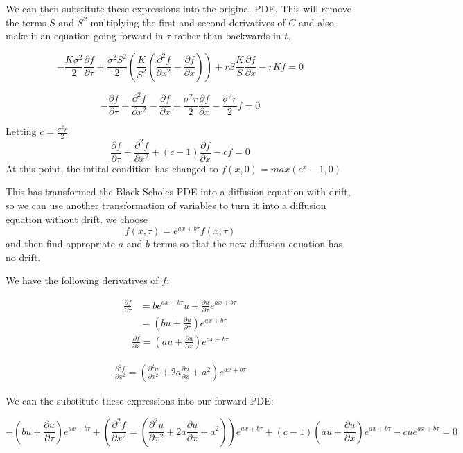 \documentclass[11pt]{article}
\begin{document}
We can then substitute these expressions into the original PDE. This will remove the terms $S$ and $S^2$ multiplying the first and second derivatives of $C$ and also make it an equation going forward in $\tau$ rather than backwards in $t$.

\[-\frac{K\sigma^2}{2} \frac{\partial f}{\partial \tau} + \frac{\sigma^2 S^2}{2} \left(\frac{K}{S^2}\left(\frac{\partial^2 f}{\partial x^2} -\frac{\partial f}{\partial x} \right) \right) + rS\frac{K}{S}\frac{\partial f}{\partial x} - rKf = 0\]

\[
-\frac{\partial f}{\partial \tau} + \frac{ \partial^2 f}{\partial x^2} - \frac{\partial f}{\partial x} + \frac{\sigma^2 r}{2}\frac{\partial f}{\partial x} -\frac{\sigma^2 r}{2} f = 0
\]

\hspace{5cm}Letting $c = \frac{\sigma^2 r}{2}$
\[
\frac{\partial f}{\partial \tau} + \frac{ \partial^2 f}{\partial x^2} + (c-1) \frac{\partial f}{\partial x} - cf = 0
\] At this point, the intital condition has changed to $f(x, 0) = max(e^x -1 , 0)$

This has transformed the Black-Scholes PDE into a diffusion equation with drift, so we can use another transformation of variables to turn it into a diffusion equation without drift. we choose \[f (x, \tau) = e^{ax+b\tau} f(x,\tau)\]  and then find appropriate $a$ and $b$ terms so that the new diffusion equation has no drift.

We have the following derivatives of $f$:

\begin{align*}
    \frac{\partial f}{\partial \tau} &= be^{ax+b\tau} u + \frac{\partial u}{\partial \tau} e^{ax+b\tau} \\
    &= \left(bu+\frac{\partial u}{\partial \tau} \right) e^{ax+b\tau}
\end{align*}
\begin{align*}
    \frac{\partial f}{\partial x} = \left(au + \frac{\partial u}{\partial x} \right) e^{ax+b\tau}
\end{align*}

\begin{align*}
    \frac{\partial^2 f}{\partial x^2} = \left( \frac{\partial^2 u}{\partial x^2} + 2a\frac{\partial u}{\partial x} + a^2 \right) e^{ax+b\tau}
\end{align*}

We can the substitute these expressions into our forward PDE:

\[
-\left(bu + \frac{\partial u}{\partial \tau} \right)e^{ax+b\tau} + \left(\frac{\partial^2 f}{\partial x^2} = \left( \frac{\partial^2 u}{\partial x^2} + 2a\frac{\partial u}{\partial x} + a^2 \right) \right) e^{ax+b\tau} + (c-1)\left (au + \frac{\partial u}{\partial x} \right) e^{ax+b\tau} - cue^{ax+b\tau} = 0
\]
\end{document}
